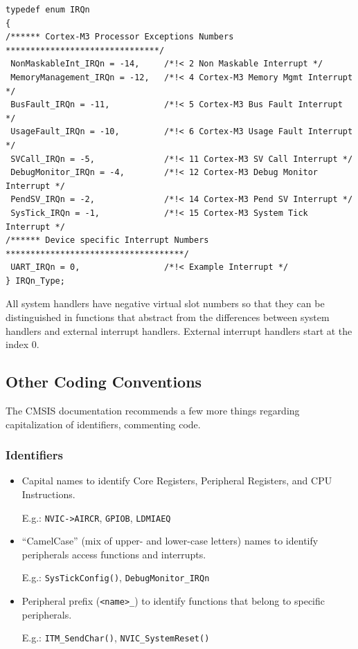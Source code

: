 \begin{lstlisting}[style=cpp,title=Listing shows the generic part of the
(\file{<device>.h}) file.] typedef enum IRQn
{
/****** Cortex-M3 Processor Exceptions Numbers *******************************/
 NonMaskableInt_IRQn = -14, 	/*!< 2 Non Maskable Interrupt */
 MemoryManagement_IRQn = -12, 	/*!< 4 Cortex-M3 Memory Mgmt Interrupt */
 BusFault_IRQn = -11, 			/*!< 5 Cortex-M3 Bus Fault Interrupt */
 UsageFault_IRQn = -10, 		/*!< 6 Cortex-M3 Usage Fault Interrupt */
 SVCall_IRQn = -5, 				/*!< 11 Cortex-M3 SV Call Interrupt */
 DebugMonitor_IRQn = -4, 		/*!< 12 Cortex-M3 Debug Monitor Interrupt */
 PendSV_IRQn = -2, 				/*!< 14 Cortex-M3 Pend SV Interrupt */
 SysTick_IRQn = -1, 			/*!< 15 Cortex-M3 System Tick Interrupt */
/****** Device specific Interrupt Numbers ************************************/
 UART_IRQn = 0, 				/*!< Example Interrupt */
} IRQn_Type;
\end{lstlisting}

All system handlers have negative virtual slot numbers so that they can be
distinguished in functions that abstract from the differences between system
handlers and external interrupt handlers. External interrupt handlers start at
the index 0.

\subsection{Other Coding Conventions}

The CMSIS documentation recommends a few more things regarding capitalization of
identifiers, commenting code.

\subsubsection{Identifiers}

\begin{itemize}
  \item Capital names to identify Core Registers, Peripheral Registers, and CPU
  Instructions.
  
  E.g.: \verb|NVIC->AIRCR|, \verb|GPIOB|, \verb|LDMIAEQ|
  
  \item “CamelCase” (mix of upper- and lower-case letters) names to identify
  peripherals access functions and interrupts.

 E.g.: \verb|SysTickConfig()|, \verb|DebugMonitor_IRQn|

  \item Peripheral prefix (\verb|<name>_|) to identify functions that belong to
  specific peripherals.

 E.g.: \verb|ITM_SendChar()|, \verb|NVIC_SystemReset()|

\end{itemize}

